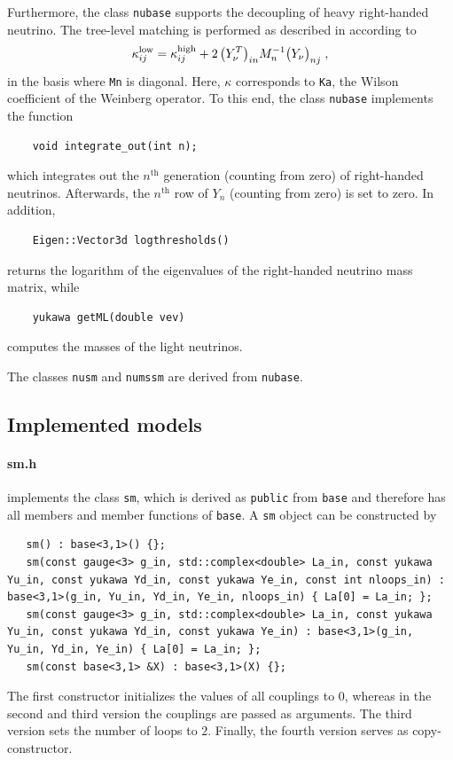 \documentclass[11pt,a4paper]{article}
\begin{document}
Furthermore, the class \texttt{nubase} supports the decoupling of heavy right-handed neutrino. The tree-level matching is performed as described in \cite{Antusch:2005gp} according to
\begin{equation}
    \kappa_{ij}^{\rm low} = \kappa_{ij}^{\rm high} + 2\, \bigl(Y_\nu^T\bigr)_{in} M_n^{-1} \bigl(Y_\nu\bigr)_{nj} \;,
\end{equation}
in the basis where \texttt{Mn} is diagonal. Here, $\kappa$ corresponds to \texttt{Ka}, the Wilson coefficient of the Weinberg operator.
To this end, the class \texttt{nubase} implements the function
\begin{lstlisting}
    void integrate_out(int n);
\end{lstlisting}
which integrates out the $n^\mathrm{th}$ generation (counting from zero) of right-handed neutrinos. 
Afterwards, the $n^\mathrm{th}$ row of $Y_n$ (counting from zero) is set to zero.
In addition, 
\begin{lstlisting}
    Eigen::Vector3d logthresholds()
\end{lstlisting}
returns the logarithm of the eigenvalues of the right-handed neutrino mass matrix, while
\begin{lstlisting}
    yukawa getML(double vev)
\end{lstlisting}
computes the masses of the light neutrinos.

The classes \texttt{nusm} and \texttt{numssm} are derived from \texttt{nubase}.

\subsection{\label{sec::models} Implemented models}
\paragraph{sm.h}
implements the class \texttt{sm}, which is derived as \texttt{public} from \texttt{base} and therefore has all members and member functions of \texttt{base}. A \texttt{sm} object can be constructed by
\begin{lstlisting}
   sm() : base<3,1>() {};
   sm(const gauge<3> g_in, std::complex<double> La_in, const yukawa Yu_in, const yukawa Yd_in, const yukawa Ye_in, const int nloops_in) : base<3,1>(g_in, Yu_in, Yd_in, Ye_in, nloops_in) { La[0] = La_in; };
   sm(const gauge<3> g_in, std::complex<double> La_in, const yukawa Yu_in, const yukawa Yd_in, const yukawa Ye_in) : base<3,1>(g_in, Yu_in, Yd_in, Ye_in) { La[0] = La_in; };
   sm(const base<3,1> &X) : base<3,1>(X) {};
\end{lstlisting}
The first constructor initializes the values of all couplings to $0$, whereas in the second and third version the couplings are passed as arguments. The third version sets the number of loops to $2$.
Finally, the fourth version serves as copy-constructor.
\end{document}
